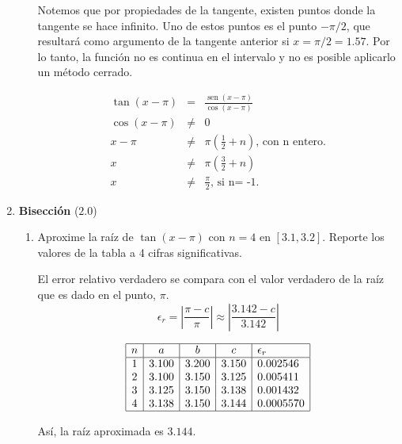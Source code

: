 \documentclass[12pt]{article}
\renewcommand{\sin}{\operatorname{sen}}
\DeclareMathOperator{\sen}{sen}
\renewcommand{\sin}{\sen}
\begin{document}
\begin{enumerate}[leftmargin=*,widest=9]
\begin{enumerate}[label=\alph*]
    Notemos que por propiedades de la tangente, existen puntos donde la tangente se hace infinito. Uno de estos puntos es el punto \(-\pi / 2\), que resultará como argumento de la tangente anterior si \(x = \pi / 2 = 1.57 \). Por lo tanto, la función no es continua en el intervalo y no es posible aplicarlo un método cerrado.
    
   \begin{eqnarray*}
   \tan(x- \pi) & = & \frac{\sin(x-\pi)}{\cos(x-\pi)} \\
   \cos(x - \pi) & \neq & 0 \\
   x - \pi & \neq & \pi \left( \frac{1}{2} + n \right) \text{, con n entero.} \\
   x & \neq & \pi \left(\frac{3}{2} + n \right) \\
   x & \neq & \frac{\pi}{2} \text{, si n= -1.}
   \end{eqnarray*}
    
    \end{enumerate}
   
    \item \textbf{Bisección} ($2.0$)
    
    \begin{enumerate}[label=\alph*]

    \item Aproxime la raíz de $\tan (x - \pi)$ con $n=4$ en $\left[3.1, 3.2\right]$. Reporte los valores de la tabla a 4 cifras significativas.
    
    El error relativo verdadero se compara con el valor verdadero de la raíz que es dado en el punto, $\pi$.
    \[ \epsilon_r = \left| \frac{\pi - c}{\pi} \right| \approx \left|\frac{3.142 - c}{3.142} \right| \]
    
    \[
    \begin{array}{|c|c|c|c|l|}
    \hline
    n & a & b & c & \epsilon_r \\
    \hline
    1 &  3.100  & 3.200 & 3.150 & 0.002546 \\
 2 &  3.100 & 3.150 & 3.125 & 0.005411 \\
 3 & 3.125 & 3.150 & 3.138 & 0.001432 \\
 4 & 3.138 & 3.150 & 3.144 & 0.0005570 \\
    \hline
    \end{array}
    \]
    
    Así, la raíz aproximada es $3.144$.
    

\end{enumerate}
\end{enumerate}
\end{document}
